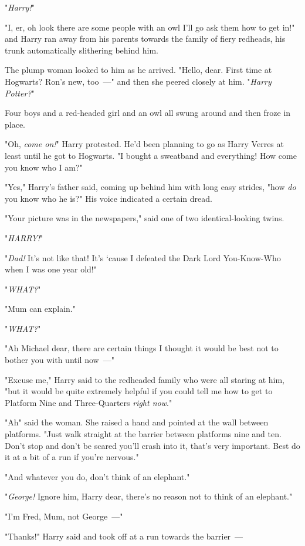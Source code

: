 "\emph{Harry!}"

"I, er, oh look there are some people with an owl I'll go ask them how to get
in!" and Harry ran away from his parents towards the family of fiery redheads,
his trunk automatically slithering behind him.

The plump woman looked to him as he arrived. "Hello, dear. First time at
Hogwarts? Ron's new, too~---" and then she peered closely at him. "\emph{Harry
Potter?}"

Four boys and a red-headed girl and an owl all swung around and then froze in
place.

"Oh, \emph{come on!}" Harry protested. He'd been planning to go as Harry Verres
at least until he got to Hogwarts. "I bought a sweatband and everything! How
come you know who I am?"

"Yes," Harry's father said, coming up behind him with long easy strides, "how
\emph{do} you know who he is?" His voice indicated a certain dread.

"Your picture was in the newspapers," said one of two identical-looking twins.

"\emph{HARRY!}"

"\emph{Dad!} It's not like that! It's `cause I defeated the Dark Lord
You-Know-Who when I was one year old!"

"\emph{WHAT?}"

"Mum can explain."

"\emph{WHAT?}"

"Ah{\el} Michael dear, there are certain things I thought it would be best
not to bother you with until now~---"

"Excuse me," Harry said to the redheaded family who were all staring at him,
"but it would be quite extremely helpful if you could tell me how to get to
Platform Nine and Three-Quarters \emph{right now}."

"Ah{\el}" said the woman. She raised a hand and pointed at the wall between
platforms. "Just walk straight at the barrier between platforms nine and ten.
Don't stop and don't be scared you'll crash into it, that's very important.
Best do it at a bit of a run if you're nervous."

"And whatever you do, don't think of an elephant."

"\emph{George!} Ignore him, Harry dear, there's no reason not to think of an
elephant."

"I'm Fred, Mum, not George~---"

"Thanks!" Harry said and took off at a run towards the barrier~---

